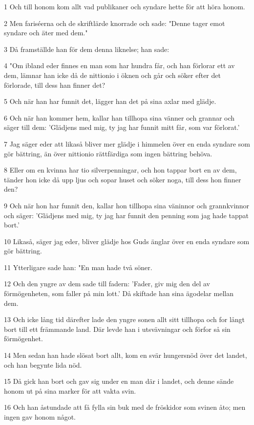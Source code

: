 \par 1 Och till honom kom allt vad publikaner och syndare hette för att höra honom.
\par 2 Men fariséerna och de skriftlärde knorrade och sade: "Denne tager emot syndare och äter med dem."
\par 3 Då framställde han för dem denna liknelse; han sade:
\par 4 "Om ibland eder finnes en man som har hundra får, och han förlorar ett av dem, lämnar han icke då de nittionio i öknen och går och söker efter det förlorade, till dess han finner det?
\par 5 Och när han har funnit det, lägger han det på sina axlar med glädje.
\par 6 Och när han kommer hem, kallar han tillhopa sina vänner och grannar och säger till dem: 'Glädjens med mig, ty jag har funnit mitt får, som var förlorat.'
\par 7 Jag säger eder att likaså bliver mer glädje i himmelen över en enda syndare som gör bättring, än över nittionio rättfärdiga som ingen bättring behöva.
\par 8 Eller om en kvinna har tio silverpenningar, och hon tappar bort en av dem, tänder hon icke då upp ljus och sopar huset och söker noga, till dess hon finner den?
\par 9 Och när hon har funnit den, kallar hon tillhopa sina väninnor och grannkvinnor och säger: 'Glädjens med mig, ty jag har funnit den penning som jag hade tappat bort.'
\par 10 Likaså, säger jag eder, bliver glädje hos Guds änglar över en enda syndare som gör bättring.
\par 11 Ytterligare sade han: "En man hade två söner.
\par 12 Och den yngre av dem sade till fadern: 'Fader, giv mig den del av förmögenheten, som faller på min lott.' Då skiftade han sina ägodelar mellan dem.
\par 13 Och icke lång tid därefter lade den yngre sonen allt sitt tillhopa och for långt bort till ett främmande land. Där levde han i utsvävningar och förfor så sin förmögenhet.
\par 14 Men sedan han hade slösat bort allt, kom en svär hungersnöd över det landet, och han begynte lida nöd.
\par 15 Då gick han bort och gav sig under en man där i landet, och denne sände honom ut på sina marker för att vakta svin.
\par 16 Och han åstundade att få fylla sin buk med de fröskidor som svinen åto; men ingen gav honom något.
